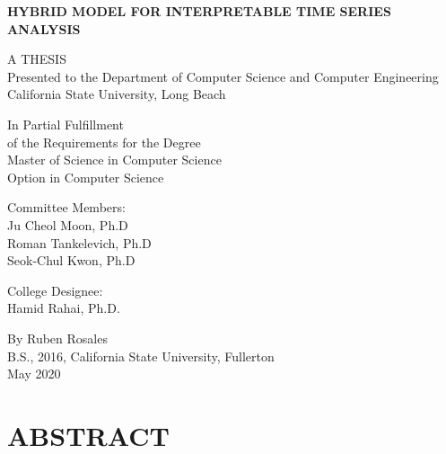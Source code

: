 \documentclass{turabian-thesis}[12pt]
\begin{document}
\frontmatter
\thispagestyle{empty}

\begin{center}
   
   \textbf{HYBRID MODEL FOR INTERPRETABLE TIME SERIES ANALYSIS}
   
   \vspace*{\baselineskip} 
      
   A THESIS \\
   Presented to the Department of Computer Science and Computer Engineering \\
   California State University, Long Beach
   
   \vspace*{\baselineskip} 

   In Partial Fulfillment \\
   of the Requirements for the Degree \\
   Master of Science in Computer Science \\
   Option in Computer Science
   
   \vspace*{\baselineskip} 

   Committee Members: \\
   Ju Cheol Moon, Ph.D \\
   Roman Tankelevich, Ph.D \\
   Seok-Chul Kwon, Ph.D

   \vspace*{\baselineskip} 

   College Designee: \\
   Hamid Rahai, Ph.D.
   
   \vspace*{\baselineskip} 

   By Ruben Rosales \\
   B.S., 2016, California State University, Fullerton \\
   May 2020
\end{center}

\pagebreak

\chapter*{ABSTRACT}

\end{document}
